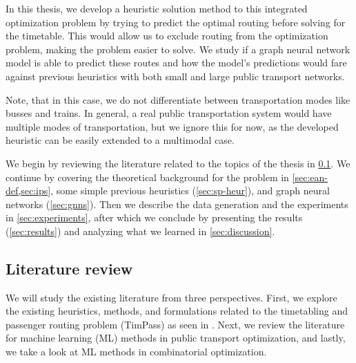\documentclass[english, 12pt, a4paper, sci, utf8, a-2b, online]{aaltothesis}
\begin{document}
In this thesis, we develop a heuristic solution method to this integrated optimization problem by trying to predict the optimal routing before solving for the timetable. This would allow us to exclude routing from the optimization problem, making the problem easier to solve. We study if a graph neural network model is able to predict these routes and how the model's predictions would fare against previous heuristics with both small and large public transport networks.

Note, that in this case, we do not differentiate between transportation modes
like busses and trains. In general, a real public transportation system would have multiple modes of transportation, but we ignore this for now, as the developed heuristic can be easily extended to a multimodal case. 

We begin by reviewing the literature related to the topics of the thesis in \cref{sec:lit-review}. We continue by covering the theoretical background for the problem in \cref{sec:ean-def,sec:ips}, some simple previous heuristics (\cref{sec:sp-heur}), and graph neural networks (\cref{sec:gnns}). Then we describe the data generation and the experiments in \cref{sec:experiments}, after which we conclude by presenting the results (\cref{sec:results}) and analyzing what we learned in \cref{sec:discussion}.

\subsection{Literature review}\label{sec:lit-review}


We will study the existing literature from three perspectives. First, we explore the existing heuristics, methods, and formulations related to the timetabling and passenger routing problem (TimPass) as seen in \cite{timpass-original-2014,schiewe2020periodic}. Next, we review the literature for machine learning (ML) methods in public transport optimization, and lastly, we take a look at ML methods in combinatorial optimization.



\end{document}
